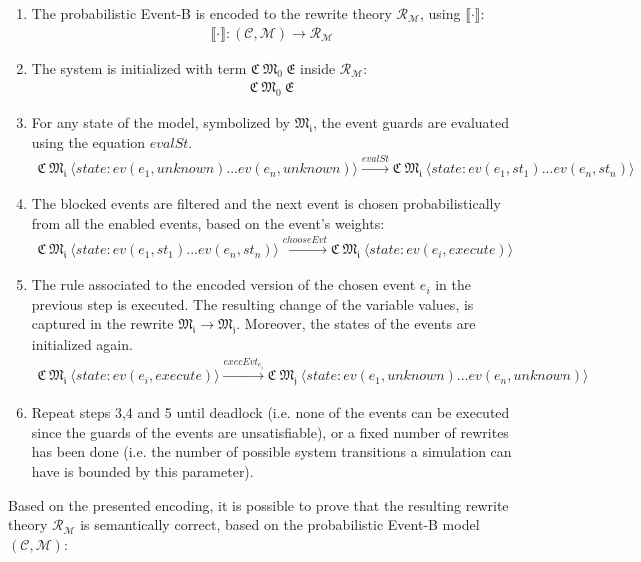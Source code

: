 \begin{enumerate}
    \item The probabilistic Event-B is encoded to the rewrite theory $\mathscr{R}_\mathscr{M}$, using $\llbracket \cdot \rrbracket$:
    \begin{align*}
        \llbracket \cdot \rrbracket: (\mathscr{C}, \mathscr{M}) \rightarrow \mathscr{R}_\mathscr{M}
    \end{align*}
    \item The system is initialized with term $\mathfrak{C \ M_0 \ E}$ inside $\mathscr{R}_\mathscr{M}$:
    \begin{align*}
        \mathfrak{C \ M_0 \ E}
    \end{align*}
    \item For any state of the model, symbolized by $\mathfrak{M_i}$, the event guards are evaluated using the equation $evalSt$.
    \begin{align*}
        \mathfrak{C \ M_i} \ \langle state: ev(e_1,unknown) ... ev(e_n, unknown) \rangle \xrightarrow{evalSt} \mathfrak{C \ M_i} \ \langle state: ev(e_1,st_1) ... ev(e_n, st_n) \rangle
    \end{align*}
    \item The blocked events are filtered and the next event is chosen probabilistically from all the enabled events, based on the event's weights:
    \begin{align*}
        \mathfrak{C \ M_i} \ \langle state: ev(e_1,st_1) ... ev(e_n, st_n) \rangle \xrightarrow{chooseEvt} \mathfrak{C \ M_i} \ \langle state: ev(e_i,execute) \rangle
    \end{align*}
    \item The rule associated to the encoded version of the chosen event $e_i$ in the previous step is executed. The resulting change of the variable values, is captured in the rewrite $\mathfrak{M_i} \rightarrow \mathfrak{M_j}$. Moreover, the states of the events are initialized again. 
    \begin{align*}
        \mathfrak{C \ M_i} \ \langle state: ev(e_i,execute) \rangle \xrightarrow{execEvt_{e_i}} \mathfrak{C \ M_j} \ \langle state: ev(e_1,unknown) ... ev(e_n, unknown) \rangle
    \end{align*}
    \item Repeat steps 3,4 and 5 until deadlock (i.e. none of the events can be executed since the guards of the events are unsatisfiable), or a fixed number of rewrites has been done (i.e. the number of possible system transitions a simulation can have is bounded by this parameter).
\end{enumerate}
Based on the presented encoding, it is possible to prove that the resulting rewrite theory $\mathscr{R}_\mathscr{M}$ is semantically correct, based on the probabilistic Event-B model $(\mathscr{C}, \mathscr{M})$:


